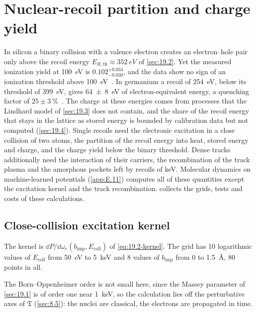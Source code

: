 \section{Nuclear-recoil partition and charge yield}\label{app:E.23}

In silicon a binary collision with a valence electron creates an electron--hole pair only above the recoil energy $E_{R,\mathrm{th}} \approx \SI{352}{eV}$ of \cref{sec:19.2}. Yet the measured ionization yield at \SI{100}{eV} is $0.102^{+0.034}_{-0.030}$, and the data show no sign of an ionization threshold above \SI{100}{eV}~\cite[Table~II]{albakry2023first}. In germanium a recoil of \SI{254}{eV}, below its threshold of \SI{399}{eV}, gives \SI{64 \pm 8}{eV} of electron-equivalent energy, a quenching factor of $25\pm\SI{3}{\percent}$~\cite{kavner2024measurement}. The charge at these energies comes from processes that the Lindhard model of \cref{sec:19.3} does not contain, and the share of the recoil energy that stays in the lattice as stored energy is bounded by calibration data but not computed (\cref{sec:19.4}). Single recoils need the electronic excitation in a close collision of two atoms, the partition of the recoil energy into heat, stored energy and charge, and the charge yield below the binary threshold. Dense tracks additionally need the interaction of their carriers, the recombination of the track plasma and the amorphous pockets left by recoils of keV. Molecular dynamics on machine-learned potentials (\cref{app:E.11}) computes all of these quantities except the excitation kernel and the track recombination.  collects the grids, tests and costs of these calculations.

\subsection{Close-collision excitation kernel}

The kernel is $\dd P/\dd\omega_e(b_{\mathrm{imp}}, E_{\mathrm{coll}})$ of \cref{eq:19.2-kernel}. The grid has 10 logarithmic values of $E_{\mathrm{coll}}$ from \SI{50}{eV} to \SI{5}{keV} and 8 values of $b_{\mathrm{imp}}$ from 0 to \SI{1.5}{\angstrom}, 80 points in all.

The Born--Oppenheimer order is not small here, since the Massey parameter of \cref{sec:19.1} is of order one near \SI{1}{keV}, so the calculation lies off the perturbative axes of $\mathfrak{T}$ (\cref{sec:8.5}): the nuclei are classical, the electrons are propagated in time.

